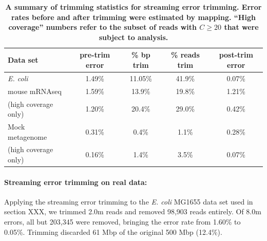 \documentclass{article}
\begin{document}
\begin{table}
\begin{tabular}{|l|c|c|c|c|}
\hline
Data set        & pre-trim error & \% bp trim & \% reads trim & post-trim error \\
\hline
{\em E. coli}   & 1.49\%         & 11.05\%          & 41.9\%      & 0.07\% \\
\hline
mouse mRNAseq   & 1.59\%         & 13.9\%           & 19.8\%      & 1.21\% \\
(high coverage only) & 1.20\%    & 20.4\%           & 29.0\%      & 0.42\% \\
\hline
Mock metagenome & 0.31\%         & 0.4\%            & 1.1\%       & 0.28\% \\
(high coverage only) & 0.16\%    & 1.4\%            & 3.5\%       & 0.07\% \\
\hline
\end{tabular}

\caption{{\bf A summary of trimming statistics for streaming error trimming.
Error rates before and after trimming were estimated by mapping. ``High
coverage'' numbers refer to the subset of reads with $C \geq 20$ that were
subject to analysis.}}
\label{tab:trimming}
\end{table}

\paragraph{Streaming error trimming on real data:}



%

Applying the streaming error trimming to the {\em E. coli} MG1655 data
set used in section XXX, we trimmed 2.0m reads and removed 98,903
reads entirely.  Of 8.0m errors, all but 203,345 were removed,
bringing the error rate from 1.60\% to 0.05\%.  Trimming discarded 61
Mbp of the original 500 Mbp (12.4\%).
\end{document}
